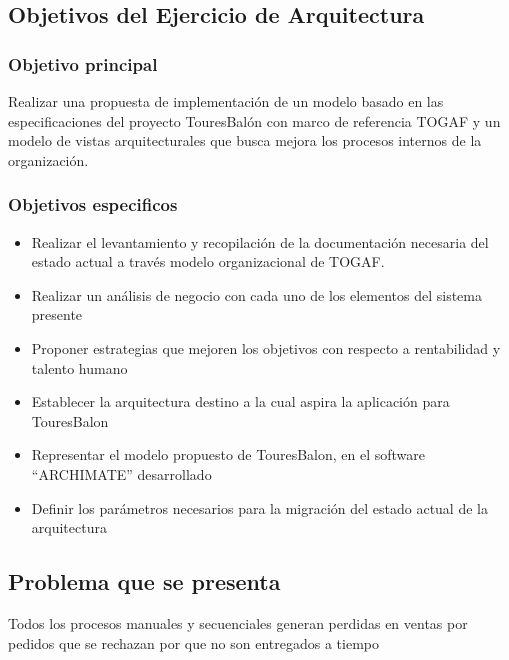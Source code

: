 \documentclass[12pt]{article}
\begin{document}
\subsection{Objetivos del Ejercicio de Arquitectura}

\subsubsection{Objetivo principal}
Realizar una propuesta de implementación de un modelo basado en las especificaciones del proyecto TouresBalón con marco de referencia TOGAF y un modelo  de vistas arquitecturales que busca mejora los procesos internos de la organización.

\subsubsection{Objetivos especificos}
\begin{itemize}
    \item Realizar el levantamiento y recopilación de la documentación necesaria del estado actual a través modelo organizacional de TOGAF.
    \item Realizar un análisis de negocio con cada uno de los elementos del sistema presente
    \item Proponer estrategias que mejoren los objetivos con respecto a rentabilidad y talento humano
    \item Establecer la arquitectura destino a la cual aspira la aplicación para TouresBalon
    \item Representar el modelo propuesto de TouresBalon, en el software “ARCHIMATE” desarrollado
    \item Definir los parámetros necesarios para la migración del estado actual de la arquitectura
\end{itemize}








\subsection{Problema que se presenta }

Todos los procesos manuales y secuenciales generan perdidas en ventas por pedidos que se rechazan por que no son entregados a tiempo


\end{document}
